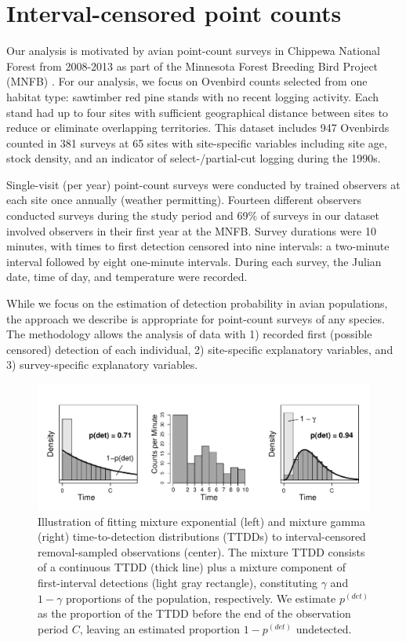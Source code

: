 \documentclass[12pt]{article}
\newcommand{\pdet}{p^{(det)}}
\begin{document}
\section{Interval-censored point counts}\label{sec:data}

Our analysis is motivated by avian point-count surveys in Chippewa National Forest from 2008-2013 as part of the Minnesota Forest Breeding Bird Project (MNFB) \citep{Hanowski1995}.  
For our analysis, we focus on Ovenbird counts selected from one habitat type: sawtimber red pine stands with no recent logging activity.  
Each stand had up to four sites with sufficient geographical distance between sites to reduce or eliminate overlapping territories.
This dataset includes 947 Ovenbirds counted in 381 surveys at 65 sites with site-specific variables including site age,  stock density, and an indicator of select-/partial-cut logging during the 1990s.

Single-visit (per year) point-count surveys were conducted by trained observers at each site once annually (weather permitting).  
Fourteen different observers conducted surveys during the study period and 69\% of surveys in our dataset involved observers in their first year at the MNFB.  
Survey durations were 10 minutes, with times to first detection censored into nine intervals: a two-minute interval followed by eight one-minute intervals.  
During each survey, the Julian date, time of day, and temperature were recorded. 

While we focus on the estimation of detection probability in avian populations, the approach we describe is appropriate for point-count surveys of any species.
The methodology allows the analysis of data with 1) recorded first (possible censored) detection of each individual, 2) site-specific explanatory variables, and 3) survey-specific explanatory variables.  

\begin{figure}\centering
\includegraphics[width=\textwidth]{"Oral Prelim/AMRO_JABES"} %
\caption{\label{fig:schematic} 
Illustration of fitting mixture exponential (left) and mixture gamma (right) time-to-detection distributions (TTDDs) to interval-censored removal-sampled observations (center).
The mixture TTDD consists of a continuous TTDD (thick line) plus a mixture component of first-interval detections (light gray rectangle), constituting $\gamma$ and $1-\gamma$ proportions of the population, respectively.
We estimate $\pdet$ as the proportion of the TTDD before the end of the observation period $C$, leaving an estimated proportion $1-\pdet$ undetected.
}
\end{figure}
\end{document}
